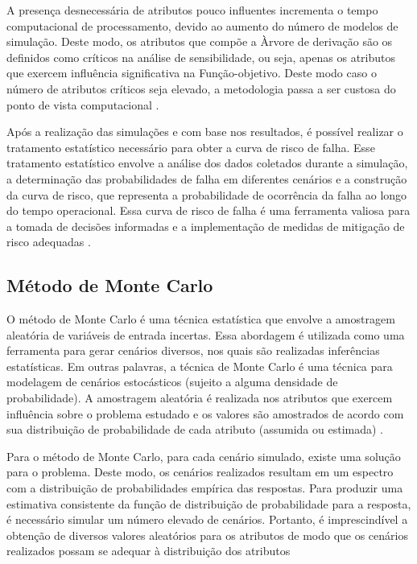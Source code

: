 A presença desnecessária de atributos pouco influentes incrementa o tempo computacional de processamento, devido ao aumento do número de modelos de simulação. Deste modo, os atributos que compõe a Àrvore de derivação são os definidos como críticos na análise de sensibilidade, ou seja, apenas os atributos que exercem influência significativa na Função-objetivo. Deste modo caso o número de atributos críticos seja elevado, a metodologia passa a ser custosa do ponto de vista computacional \cite{madeira}.

Após a realização das simulações e com base nos resultados, é possível realizar o tratamento estatístico necessário para obter a curva de risco de falha. Esse tratamento estatístico envolve a análise dos dados coletados durante a simulação, a determinação das probabilidades de falha em diferentes cenários e a construção da curva de risco, que representa a probabilidade de ocorrência da falha ao longo do tempo operacional. Essa curva de risco de falha é uma ferramenta valiosa para a tomada de decisões informadas e a implementação de medidas de mitigação de risco adequadas \cite{risso1}.


\subsection{Método de Monte Carlo}

O método de Monte Carlo é uma técnica estatística que envolve a amostragem aleatória de variáveis de entrada incertas. Essa abordagem é utilizada como uma ferramenta para gerar cenários diversos, nos quais são realizadas inferências estatísticas. Em outras palavras, a técnica de Monte Carlo é uma técnica para modelagem de cenários estocásticos (sujeito a alguma densidade de probabilidade). A amostragem aleatória é realizada nos atributos que exercem influência sobre o problema estudado e os valores são amostrados de acordo com sua distribuição de probabilidade de cada atributo (assumida ou estimada) \cite{hammers}.

Para o método de Monte Carlo, para cada cenário simulado, existe uma solução para o problema. Deste modo, os cenários realizados resultam em um espectro com a distribuição de probabilidades empírica das respostas. Para produzir uma estimativa consistente da função de distribuição de probabilidade para a resposta, é necessário simular um número elevado de cenários. Portanto, é imprescindível a obtenção de diversos valores aleatórios para os atributos de modo que os cenários realizados possam se adequar à distribuição dos atributos \cite{Srikanta}


